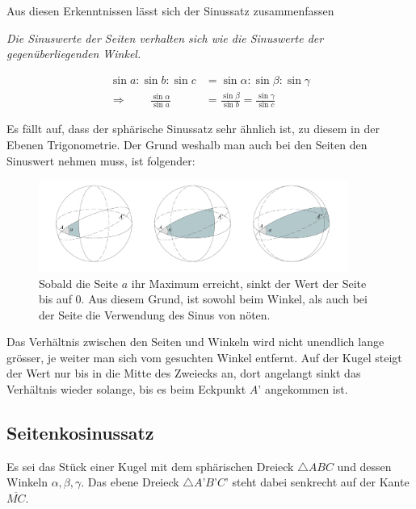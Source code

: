 \begin{refsection}
Aus diesen Erkenntnissen lässt sich der Sinussatz zusammenfassen
\begin{satz}\textit{Die Sinuswerte der Seiten verhalten sich wie die Sinuswerte der gegenüberliegenden Winkel.}
\label{skript:kugel:satz:Sinussatz}
\end{satz}

\begin{align*}
\sin a : \sin b : \sin c &= \sin \alpha : \sin \beta : \sin \gamma \\
\Rightarrow \quad \quad
\frac{\sin \alpha} {\sin a} &= \frac{\sin \beta} {\sin b} = \frac{\sin \gamma} {\sin c}
\end{align*} 

Es fällt auf, dass der sphärische Sinussatz sehr ähnlich ist, zu diesem in der Ebenen Trigonometrie.
Der Grund weshalb man auch bei den Seiten den Sinuswert nehmen muss, ist folgender:

\begin{figure}[htbp]
\centering
\includegraphics[width=0.9\textwidth]{kugel/SinussatzB.jpg}
\caption{Sobald die Seite $a$ ihr Maximum erreicht, sinkt der Wert der Seite bis auf 0. Aus diesem Grund, ist sowohl beim Winkel, als auch bei der Seite die Verwendung des Sinus von nöten.}
\end{figure}

Das Verhältnis zwischen den Seiten und Winkeln wird nicht unendlich lange grösser, je weiter man sich vom gesuchten Winkel entfernt. Auf der Kugel steigt der Wert nur bis in die Mitte des Zweiecks an, dort angelangt sinkt das Verhältnis wieder solange, bis es beim Eckpunkt $A’$ angekommen ist.


\subsection{Seitenkosinussatz}
Es sei das Stück einer Kugel mit dem sphärischen Dreieck $\triangle{ABC}$ und dessen Winkeln $\alpha, \beta, \gamma$. Das ebene Dreieck $\triangle{A’B’C’}$ steht dabei senkrecht auf der Kante $\overline{MC}$.


\end{refsection}
